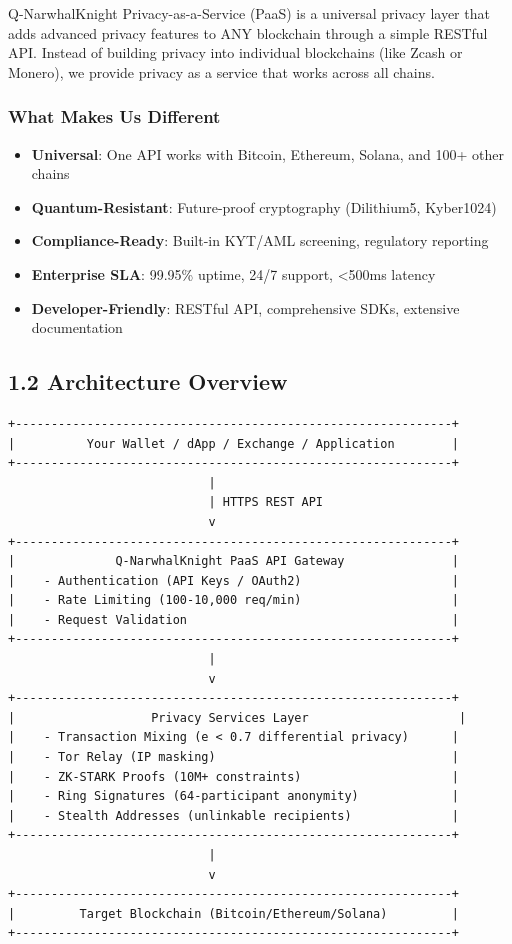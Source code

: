 \documentclass[11pt,a4paper]{article}
\begin{document}
Q-NarwhalKnight Privacy-as-a-Service (PaaS) is a universal privacy layer that adds advanced privacy features to ANY blockchain through a simple RESTful API. Instead of building privacy into individual blockchains (like Zcash or Monero), we provide privacy as a service that works across all chains.

\subsubsection{What Makes Us Different}

\begin{itemize}
    \item \textbf{Universal}: One API works with Bitcoin, Ethereum, Solana, and 100+ other chains
    \item \textbf{Quantum-Resistant}: Future-proof cryptography (Dilithium5, Kyber1024)
    \item \textbf{Compliance-Ready}: Built-in KYT/AML screening, regulatory reporting
    \item \textbf{Enterprise SLA}: 99.95\% uptime, 24/7 support, <500ms latency
    \item \textbf{Developer-Friendly}: RESTful API, comprehensive SDKs, extensive documentation
\end{itemize}

\subsection{1.2 Architecture Overview}

\begin{verbatim}
+-------------------------------------------------------------+
|          Your Wallet / dApp / Exchange / Application        |
+-------------------------------------------------------------+
                            |
                            | HTTPS REST API
                            v
+-------------------------------------------------------------+
|              Q-NarwhalKnight PaaS API Gateway               |
|    - Authentication (API Keys / OAuth2)                     |
|    - Rate Limiting (100-10,000 req/min)                     |
|    - Request Validation                                     |
+-------------------------------------------------------------+
                            |
                            v
+-------------------------------------------------------------+
|                   Privacy Services Layer                     |
|    - Transaction Mixing (e < 0.7 differential privacy)      |
|    - Tor Relay (IP masking)                                 |
|    - ZK-STARK Proofs (10M+ constraints)                     |
|    - Ring Signatures (64-participant anonymity)             |
|    - Stealth Addresses (unlinkable recipients)              |
+-------------------------------------------------------------+
                            |
                            v
+-------------------------------------------------------------+
|         Target Blockchain (Bitcoin/Ethereum/Solana)         |
+-------------------------------------------------------------+
\end{verbatim}
\end{document}
